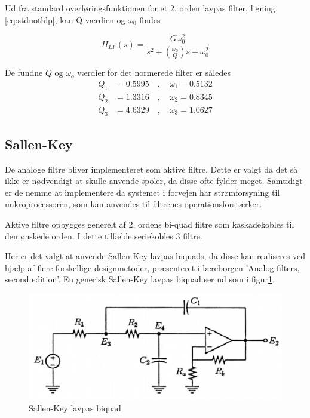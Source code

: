 Ud fra standard overføringsfunktionen for et 2. orden lavpas filter, ligning \ref{eq:stdnothlp}, kan Q-værdien og $\omega_0$ findes 

\begin{equation}
\label{eq:stdnothlp}
H_{LP}(s) = \frac{G\omega_0^2}{s^2 + \left(\frac{\omega_0}{Q}\right)s + \omega_0^2}
\end{equation}

De fundne $Q$ og $\omega_o$ værdier for det normerede filter er således
\begin{align}
	Q_1 &= \num{0.5995} \quad , \quad \omega_1= \num{0.5132} \nonumber \\
	Q_2 &= \num{1.3316} \quad , \quad \omega_2= \num{0.8345} \nonumber \\
	Q_3 &= \num{4.6329} \quad , \quad \omega_3= \num{1.0627} \label{eq:q_and_w_norm}
\end{align}

\subsection{Sallen-Key}

De analoge filtre bliver implementeret som aktive filtre. Dette er valgt da det så ikke er nødvendigt at skulle anvende spoler, da disse ofte fylder meget.
Samtidigt er de nemme at implementere da systemet i forvejen har strømforsyning til mikroprocessoren, som kan anvendes til filtrenes operationsforstærker.

Aktive filtre opbygges generelt af 2. ordens bi-quad filtre som kaskadekobles til den ønskede orden.
I dette tilfælde seriekobles 3 filtre. 


Her er det valgt at anvende Sallen-Key lavpas biquads,
da disse kan realiseres ved hjælp af flere forskellige designmetoder, præsenteret 
i læreborgen 'Analog filters, second edition'\cite{KendallSu}.
En generisk Sallen-Key lavpas biquad ser ud som i figur\ref{fig:sklpbq}.

\begin{figure}[H]
	\centering
	\includegraphics[width=.6\textwidth]{billeder/sklpbq}
	\caption{Sallen-Key lavpas biquad \cite{KendallSu}}
	\label{fig:sklpbq}
\end{figure}

